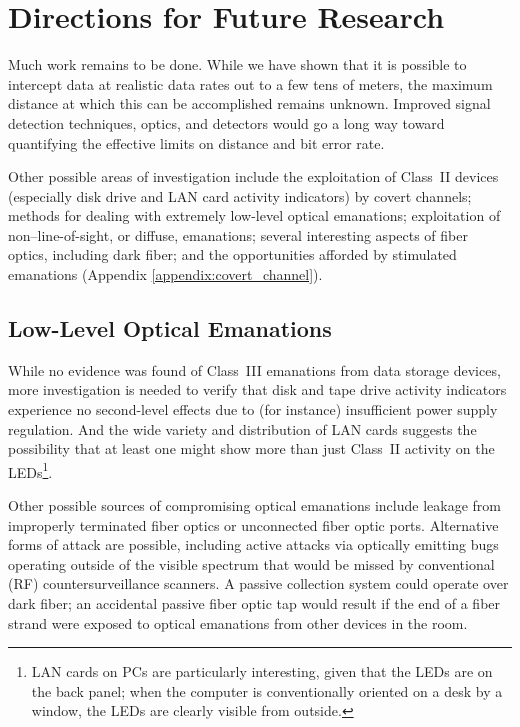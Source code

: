 \documentclass{acmtrans2e}
\begin{document}
\section{Directions for Future Research}

Much work remains to be done.  While we have shown that it is possible
to intercept data at realistic data rates out to a few tens of meters,
the maximum distance at which this can be accomplished remains unknown.
Improved signal detection techniques, optics, and detectors would go
a long way toward quantifying the effective limits on distance and bit
error rate.

Other possible areas of investigation include the exploitation of Class~II
devices (especially disk drive and LAN card activity indicators) by
covert channels; methods for dealing with extremely low-level optical
emanations; exploitation of non--line-of-sight, or diffuse, emanations;
several interesting aspects of
fiber optics, including dark fiber; and the opportunities afforded by
stimulated emanations (Appendix \ref{appendix:covert_channel}).

\subsection{Low-Level Optical Emanations}

While no evidence was found of Class~III emanations from data storage 
devices, more investigation is needed to verify that disk and tape drive 
activity indicators experience no second-level effects due to (for instance)
insufficient power supply regulation.  And the wide variety and 
distribution of LAN cards suggests the possibility that at least one 
might show more than just Class~II activity on the LEDs\footnote{LAN 
cards on PCs are particularly interesting, given that the LEDs are on 
the back panel; when the computer is conventionally oriented on a desk
by a window, the LEDs are clearly visible from outside.}.

Other possible sources of compromising optical emanations include 
leakage from improperly terminated fiber optics or unconnected fiber 
optic ports.  Alternative forms of attack are possible, including active 
attacks via optically emitting bugs operating outside of the visible 
spectrum that would be missed by conventional (RF) countersurveillance 
scanners.  A passive collection system could operate over dark fiber;
an accidental passive fiber optic tap would result if the end of a fiber
strand were exposed to optical emanations from other devices in the room.
\end{document}
